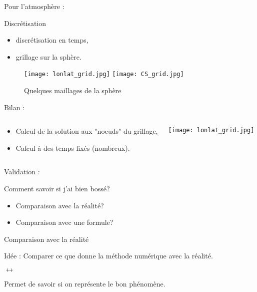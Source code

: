 \documentclass[11pt]{beamer}
\begin{document}
\begin{frame}{Pour l'atmosphère :}

\begin{block}{Discrétisation}
\begin{itemize}
\item discrétisation en temps,
\item grillage sur la sphère.
\end{itemize}
\end{block}

\begin{figure}
\texttt{[image: lonlat\_grid.jpg]} \hspace{1cm}
\texttt{[image: CS\_grid.jpg]}
\caption{Quelques maillages de la sphère}
\end{figure}

\end{frame}

\begin{frame}{Bilan :}
\begin{columns}
\begin{block}{}
\begin{itemize}
\item Calcul de la solution aux "noeuds" du grillage,
\item Calcul à des temps fixés (nombreux).
\end{itemize}
\end{block}

\texttt{[image: lonlat\_grid.jpg]} 

\end{columns}
\end{frame}



\begin{frame}{Validation :}
\begin{block}{}
Comment savoir si j'ai bien bossé?
\end{block}

\pause
\begin{itemize}
\item Comparaison avec la réalité?
\item Comparaison avec une formule?
\end{itemize}
\end{frame}

\begin{frame}{Comparaison avec la réalité}
\begin{block}{Idée :}
Comparer ce que donne la méthode numérique avec la réalité.

\vspace{0.3cm}
\begin{center}
 $\longleftrightarrow$ 
\end{center}
\vspace{0.3cm}
\end{block}

\begin{exampleblock}{}
Permet de savoir si on représente le bon phénomène.
\end{exampleblock}
\end{frame}
\end{document}
